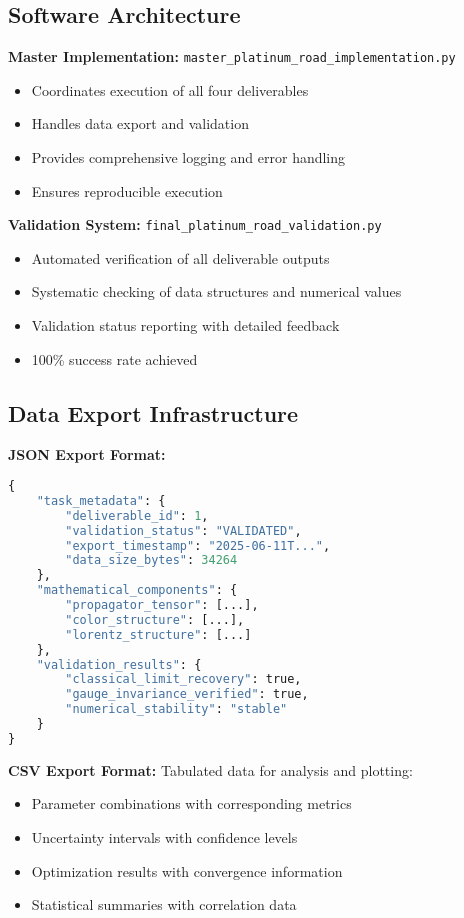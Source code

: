 \documentclass[11pt]{article}
\begin{document}
\subsection{Software Architecture}

\textbf{Master Implementation:} \texttt{master\_platinum\_road\_implementation.py}
\begin{itemize}
\item Coordinates execution of all four deliverables
\item Handles data export and validation
\item Provides comprehensive logging and error handling
\item Ensures reproducible execution
\end{itemize}

\textbf{Validation System:} \texttt{final\_platinum\_road\_validation.py}
\begin{itemize}
\item Automated verification of all deliverable outputs
\item Systematic checking of data structures and numerical values
\item Validation status reporting with detailed feedback
\item 100\% success rate achieved
\end{itemize}

\subsection{Data Export Infrastructure}

\textbf{JSON Export Format:}
\begin{lstlisting}[language=Python, caption=Typical JSON Structure]
{
    "task_metadata": {
        "deliverable_id": 1,
        "validation_status": "VALIDATED",
        "export_timestamp": "2025-06-11T...",
        "data_size_bytes": 34264
    },
    "mathematical_components": {
        "propagator_tensor": [...],
        "color_structure": [...],
        "lorentz_structure": [...]
    },
    "validation_results": {
        "classical_limit_recovery": true,
        "gauge_invariance_verified": true,
        "numerical_stability": "stable"
    }
}
\end{lstlisting}

\textbf{CSV Export Format:} Tabulated data for analysis and plotting:
\begin{itemize}
\item Parameter combinations with corresponding metrics
\item Uncertainty intervals with confidence levels
\item Optimization results with convergence information
\item Statistical summaries with correlation data
\end{itemize}
\end{document}
